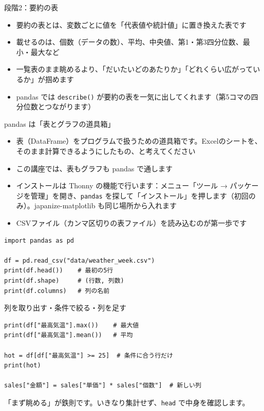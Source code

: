 \documentclass[aspectratio=169,11pt]{beamer}
\begin{document}
\begin{frame}{段階2：要約の表}
\begin{itemize}
\item 要約の表とは、変数ごとに値を「代表値や統計値」に置き換えた表です
\item 載せるのは、個数（データの数）、平均、中央値、第1・第3四分位数、最小・最大など
\item 一覧表のまま眺めるより、「だいたいどのあたりか」「どれくらい広がっているか」が掴めます
\item pandas では \texttt{describe()} が要約の表を一気に出してくれます（第5コマの四分位数とつながります）
\end{itemize}
\end{frame}

\begin{frame}[fragile]{pandas は「表とグラフの道具箱」}
\begin{itemize}
\item 表（DataFrame）をプログラムで扱うための道具箱です。Excelのシートを、そのまま計算できるようにしたもの、と考えてください
\item この講座では、表もグラフも pandas で通します
\item インストールは Thonny の機能で行います：メニュー「ツール → パッケージを管理」を開き、\texttt{pandas} を探して「インストール」を押します（初回のみ）。japanize-matplotlib も同じ場所から入れます
\item CSVファイル（カンマ区切りの表ファイル）を読み込むのが第一歩です
\end{itemize}
\begin{lstlisting}
import pandas as pd

df = pd.read_csv("data/weather_week.csv")
print(df.head())    # 最初の5行
print(df.shape)     # (行数, 列数)
print(df.columns)   # 列の名前
\end{lstlisting}
\end{frame}

\begin{frame}[fragile]{列を取り出す・条件で絞る・列を足す}
\begin{lstlisting}
print(df["最高気温"].max())    # 最大値
print(df["最高気温"].mean())   # 平均

hot = df[df["最高気温"] >= 25]  # 条件に合う行だけ
print(hot)

sales["金額"] = sales["単価"] * sales["個数"]  # 新しい列
\end{lstlisting}
「まず眺める」が鉄則です。いきなり集計せず、\texttt{head} で中身を確認します。
\end{frame}
\end{document}
